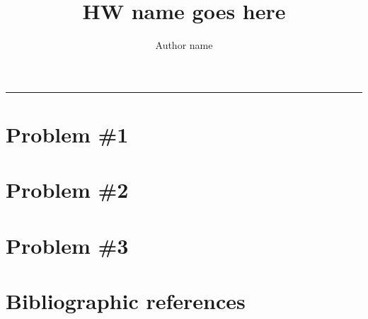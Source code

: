 \documentclass[12pt]{article}
\title{\vspace{-0.75in}\large{HW name goes here}}
\author[]{Author name}
\numberwithin{equation}{section}
\theoremstyle{definition}
\begin{document}
\date{}
\maketitle
\vspace{-0.5cm} \hrule


\setcounter{page}{1}


\section{Problem \#1}



\section{Problem \#2}



\section{Problem \#3}




\section*{Bibliographic references}
\end{document}
